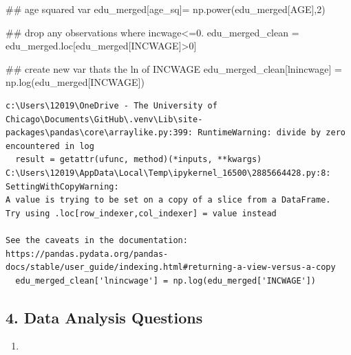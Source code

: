 \documentclass[
  letterpaper,
  DIV=11,
  numbers=noendperiod]{scrartcl}
\newenvironment{Shaded}{\begin{snugshade}}{\end{snugshade}}
\newcommand{\CommentTok}[1]{\textcolor[rgb]{0.37,0.37,0.37}{#1}}
\newcommand{\DecValTok}[1]{\textcolor[rgb]{0.68,0.00,0.00}{#1}}
\newcommand{\NormalTok}[1]{\textcolor[rgb]{0.00,0.23,0.31}{#1}}
\newcommand{\OperatorTok}[1]{\textcolor[rgb]{0.37,0.37,0.37}{#1}}
\newcommand{\StringTok}[1]{\textcolor[rgb]{0.13,0.47,0.30}{#1}}
\providecommand{\tightlist}{%
  \setlength{\itemsep}{0pt}\setlength{\parskip}{0pt}}\usepackage{longtable,booktabs,array}
\begin{document}
\begin{Shaded}
\begin{Highlighting}[]
\CommentTok{\#\# age squared var }
\NormalTok{edu\_merged[}\StringTok{\textquotesingle{}age\_sq\textquotesingle{}}\NormalTok{]}\OperatorTok{=}\NormalTok{ np.power(edu\_merged[}\StringTok{\textquotesingle{}AGE\textquotesingle{}}\NormalTok{],}\DecValTok{2}\NormalTok{) }

\CommentTok{\#\# drop any observations where incwage\textless{}=0.}
\NormalTok{edu\_merged\_clean }\OperatorTok{=}\NormalTok{ edu\_merged.loc[edu\_merged[}\StringTok{\textquotesingle{}INCWAGE\textquotesingle{}}\NormalTok{]}\OperatorTok{\textgreater{}}\DecValTok{0}\NormalTok{]}

\CommentTok{\#\# create new var that\textquotesingle{}s the ln of INCWAGE}
\NormalTok{edu\_merged\_clean[}\StringTok{\textquotesingle{}lnincwage\textquotesingle{}}\NormalTok{] }\OperatorTok{=}\NormalTok{ np.log(edu\_merged[}\StringTok{\textquotesingle{}INCWAGE\textquotesingle{}}\NormalTok{])}
\end{Highlighting}
\end{Shaded}

\begin{verbatim}
c:\Users\12019\OneDrive - The University of Chicago\Documents\GitHub\.venv\Lib\site-packages\pandas\core\arraylike.py:399: RuntimeWarning: divide by zero encountered in log
  result = getattr(ufunc, method)(*inputs, **kwargs)
C:\Users\12019\AppData\Local\Temp\ipykernel_16500\2885664428.py:8: SettingWithCopyWarning: 
A value is trying to be set on a copy of a slice from a DataFrame.
Try using .loc[row_indexer,col_indexer] = value instead

See the caveats in the documentation: https://pandas.pydata.org/pandas-docs/stable/user_guide/indexing.html#returning-a-view-versus-a-copy
  edu_merged_clean['lnincwage'] = np.log(edu_merged['INCWAGE'])
\end{verbatim}

\subsection{4. Data Analysis Questions}\label{data-analysis-questions}

\begin{enumerate}
\def\labelenumi{\arabic{enumi}.}
\tightlist
\item
\end{enumerate}
\end{document}
